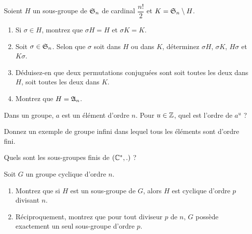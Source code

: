 \begin{exoss}
Soient \(H\) un sous-groupe de \(\S{n}\) de cardinal \(\dfrac{n!}{2}\) et \(K=\S{n}\excluant H\).

\begin{enumerate}
    \item Si \(\sigma\in H\), montrez que \(\sigma H=H\) et \(\sigma K=K\). \\
    \item Soit \(\sigma\in\S{n}\). Selon que \(\sigma\) soit dans \(H\) ou dans \(K\), déterminez \(\sigma H\), \(\sigma K\), \(H\sigma\) et \(K\sigma\). \\
    \item Déduisez-en que deux permutations conjuguées sont soit toutes les deux dans \(H\), soit toutes les deux dans \(K\). \\
    \item Montrez que \(H=\frakA{n}\).
\end{enumerate}
\end{exoss}

\begin{exos}
Dans un groupe, \(a\) est un élément d'ordre \(n\). Pour \(u\in\Z\), quel est l'ordre de \(a^u\) ?
\end{exos}

\begin{exos}
Donnez un exemple de groupe infini dans lequel tous les éléments sont d'ordre fini.
\end{exos}

\begin{exoss}
Quels sont les sous-groupes finis de \(\groupe{\Cs}[.]\) ?
\end{exoss}

\begin{exoss}
Soit \(G\) un groupe cyclique d'ordre \(n\).

\begin{enumerate}
    \item Montrez que si \(H\) est un sous-groupe de \(G\), alors \(H\) est cyclique d'ordre \(p\) divisant \(n\). \\
    \item Réciproquement, montrez que pour tout diviseur \(p\) de \(n\), \(G\) possède exactement un seul sous-groupe d'ordre \(p\).
\end{enumerate}
\end{exoss}

